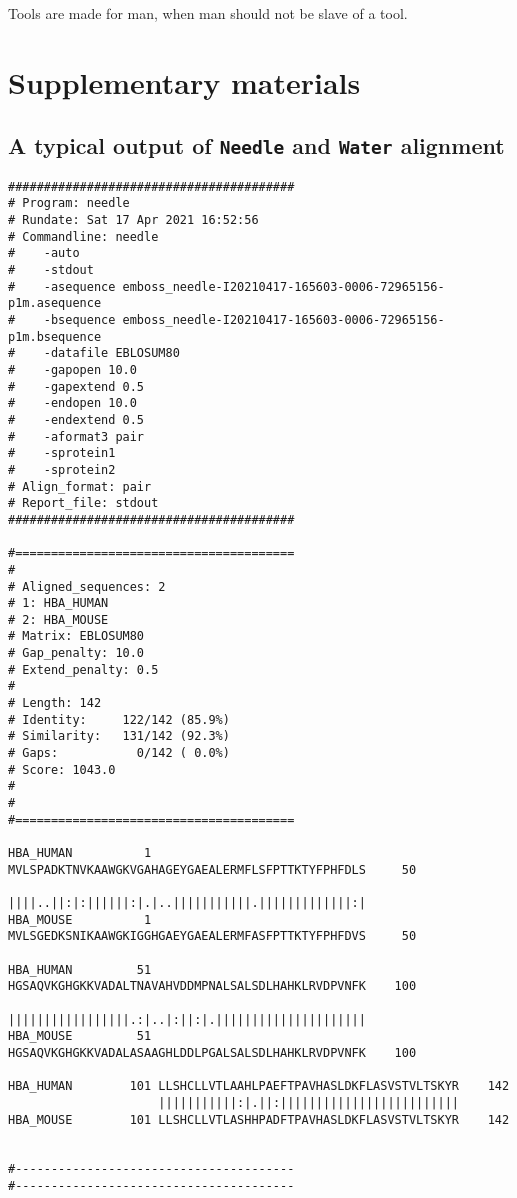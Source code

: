 \documentclass[en,black,10pt,normal]{elegantnote}
\begin{document}
Tools are made for man, when man should not be slave of a tool.


\section{Supplementary materials}

\subsection{A typical output of \texttt{Needle} and \texttt{Water} alignment}

\begin{lstlisting}[frame=single]
########################################
# Program: needle
# Rundate: Sat 17 Apr 2021 16:52:56
# Commandline: needle
#    -auto
#    -stdout
#    -asequence emboss_needle-I20210417-165603-0006-72965156-p1m.asequence
#    -bsequence emboss_needle-I20210417-165603-0006-72965156-p1m.bsequence
#    -datafile EBLOSUM80
#    -gapopen 10.0
#    -gapextend 0.5
#    -endopen 10.0
#    -endextend 0.5
#    -aformat3 pair
#    -sprotein1
#    -sprotein2
# Align_format: pair
# Report_file: stdout
########################################

#=======================================
#
# Aligned_sequences: 2
# 1: HBA_HUMAN
# 2: HBA_MOUSE
# Matrix: EBLOSUM80
# Gap_penalty: 10.0
# Extend_penalty: 0.5
#
# Length: 142
# Identity:     122/142 (85.9%)
# Similarity:   131/142 (92.3%)
# Gaps:           0/142 ( 0.0%)
# Score: 1043.0
# 
#
#=======================================

HBA_HUMAN          1 MVLSPADKTNVKAAWGKVGAHAGEYGAEALERMFLSFPTTKTYFPHFDLS     50
                     ||||..||:|:||||||:|.|..|||||||||||.|||||||||||||:|
HBA_MOUSE          1 MVLSGEDKSNIKAAWGKIGGHGAEYGAEALERMFASFPTTKTYFPHFDVS     50

HBA_HUMAN         51 HGSAQVKGHGKKVADALTNAVAHVDDMPNALSALSDLHAHKLRVDPVNFK    100
                     |||||||||||||||||.:|..|:||:|.|||||||||||||||||||||
HBA_MOUSE         51 HGSAQVKGHGKKVADALASAAGHLDDLPGALSALSDLHAHKLRVDPVNFK    100

HBA_HUMAN        101 LLSHCLLVTLAAHLPAEFTPAVHASLDKFLASVSTVLTSKYR    142
                     |||||||||||:|.||:|||||||||||||||||||||||||
HBA_MOUSE        101 LLSHCLLVTLASHHPADFTPAVHASLDKFLASVSTVLTSKYR    142


#---------------------------------------
#---------------------------------------
\end{lstlisting}

{}
\end{document}
